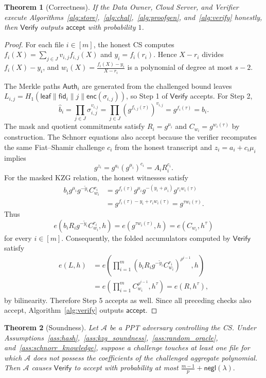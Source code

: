 \documentclass[lettersize,journal]{IEEEtran}
\newtheorem{theorem}{Theorem}
\newcommand{\Verify}{\mathsf{Verify}}
\begin{document}
\begin{theorem}[Correctness]\label{thm:correctness}
If the Data Owner, Cloud Server, and Verifier execute Algorithms~\ref{alg:store},~\ref{alg:chal},~\ref{alg:proofgen}, and~\ref{alg:verify} honestly, then $\Verify$ outputs $\mathsf{accept}$ with probability $1$.
\end{theorem}

\begin{proof}
For each file $i\in[m]$, the honest CS computes
$
f_i(X)=\sum_{j\in J}v_{i,j}f_{i,j}(X)
$
and $y_i=f_i(r_i)$. Hence $X-r_i$ divides $f_i(X)-y_i$, and
$
w_i(X)=\frac{f_i(X)-y_i}{X-r_i}
$
is a polynomial of degree at most $s-2$.

The Merkle paths $\mathsf{Auth}_i$ are generated from the challenged bound leaves $L_{i,j}=H_1(\mathsf{leaf}\|\mathsf{fid}_i\|j\|\mathsf{enc}(\sigma_{i,j}))$, so Step 1 of $\Verify$ accepts. For Step 2,
\[
\hat b_i=\prod_{j\in J}\sigma_{i,j}^{v_{i,j}}
=\prod_{j\in J}\left(g^{f_{i,j}(\tau)}\right)^{v_{i,j}}
=g^{f_i(\tau)}
=b_i .
\]
The mask and quotient commitments satisfy $R_i=g^{\mu_i}$ and $C_{w_i}=g^{w_i(\tau)}$ by construction. The Schnorr equations also accept because the verifier recomputes the same Fiat--Shamir challenge \(c_i\) from the honest transcript and \(z_i=a_i+c_i\mu_i\) implies
\[
    g^{z_i}=g^{a_i}(g^{\mu_i})^{c_i}=A_iR_i^{c_i}.
\]
For the masked KZG relation, the honest witnesses satisfy
\begin{align*}
b_ig^{\mu_i}g^{-\tilde{y}_i}C_{w_i}^{r_i}
&=g^{f_i(\tau)}g^{\mu_i}g^{-(y_i+\mu_i)}g^{r_iw_i(\tau)}\\
&=g^{f_i(\tau)-y_i+r_iw_i(\tau)}
=g^{\tau w_i(\tau)} .
\end{align*}
Thus
\[
    e(b_iR_i g^{-\tilde y_i}C_{w_i}^{r_i},h)
    =
    e(g^{\tau w_i(\tau)},h)
    =
    e(C_{w_i},h^\tau)
\]
for every \(i\in[m]\). Consequently, the folded accumulators computed by \(\Verify\) satisfy
\[
\begin{aligned}
e(L,h)
&=
e\!\left(\prod_{i=1}^m
    (b_iR_i g^{-\tilde y_i}C_{w_i}^{r_i})^{\rho^{i-1}},h
  \right) \\
&=
e\!\left(\prod_{i=1}^m C_{w_i}^{\rho^{i-1}},h^\tau\right)
=e(R,h^\tau),
\end{aligned}
\]
by bilinearity. Therefore Step 5 accepts as well. Since all preceding checks also accept, Algorithm~\ref{alg:verify} outputs \(\mathsf{accept}\).
\end{proof}

\begin{theorem}[Soundness]\label{thm:soundness}
Let $\mathcal{A}$ be a PPT adversary controlling the CS. Under Assumptions~\ref{ass:hash},~\ref{ass:kzg_soundness},~\ref{ass:random_oracle}, and~\ref{ass:schnorr_knowledge}, suppose a challenge touches at least one file for which $\mathcal{A}$ does not possess the coefficients of the challenged aggregate polynomial. Then $\mathcal{A}$ causes $\Verify$ to accept with probability at most
$
\frac{m-1}{p}+\mathsf{negl}(\lambda).
$
\end{theorem}
\end{document}
